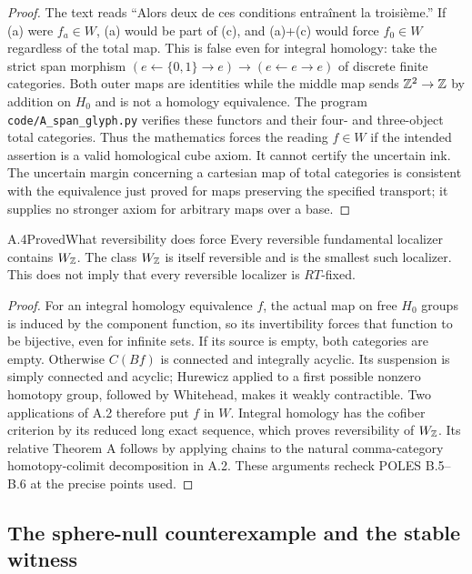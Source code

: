 \begin{proof}
The text reads ``Alors deux de ces conditions entraînent la troisième.'' If (a) were $f_a\in W$, (a) would be part of (c), and (a)+(c) would force $f_0\in W$ regardless of the total map. This is false even for integral homology: take the strict span morphism $(e\leftarrow\{0,1\}\to e)\to(e\leftarrow e\to e)$ of discrete finite categories. Both outer maps are identities while the middle map sends $\mathbb Z^2\to\mathbb Z$ by addition on $H_0$ and is not a homology equivalence. The program \texttt{code/A\_span\_glyph.py} verifies these functors and their four- and three-object total categories. Thus the mathematics forces the reading $f\in W$ if the intended assertion is a valid homological cube axiom. It cannot certify the uncertain ink. The uncertain margin concerning a cartesian map of total categories is consistent with the equivalence just proved for maps preserving the specified transport; it supplies no stronger axiom for arbitrary maps over a base.
\end{proof}

\begin{claim}{A.4}{Proved}{What reversibility does force}\label{A4}
Every reversible fundamental localizer contains $W_{\mathbb Z}$. The class $W_{\mathbb Z}$ is itself reversible and is the smallest such localizer. This does not imply that every reversible localizer is $RT$-fixed.
\end{claim}
\begin{proof}
For an integral homology equivalence $f$, the actual map on free $H_0$ groups is induced by the component function, so its invertibility forces that function to be bijective, even for infinite sets. If its source is empty, both categories are empty. Otherwise $C(Bf)$ is connected and integrally acyclic. Its suspension is simply connected and acyclic; Hurewicz applied to a first possible nonzero homotopy group, followed by Whitehead, makes it weakly contractible. Two applications of A.2 therefore put $f$ in $W$. Integral homology has the cofiber criterion by its reduced long exact sequence, which proves reversibility of $W_{\mathbb Z}$. Its relative Theorem A follows by applying chains to the natural comma-category homotopy-colimit decomposition in A.2. These arguments recheck POLES B.5--B.6 at the precise points used.
\end{proof}

\subsection{The sphere-null counterexample and the stable witness}

